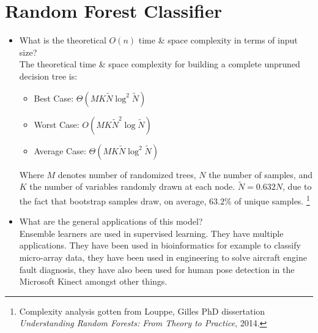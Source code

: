 \documentclass[twoside,openright,titlepage,numbers=noenddot,headinclude,%
               footinclude=true,cleardoublepage=empty,abstractoff,BCOR=5mm,%
               paper=a4,fontsize=11pt,ngerman,american]{scrreprt}
\numberwithin{theorem}{chapter}
\numberwithin{definition}{chapter}
\numberwithin{algorithm}{chapter}
\numberwithin{figure}{chapter}
\numberwithin{table}{chapter}
\numberwithin{equation}{chapter}
\begin{document}
\section*{Random Forest Classifier}
\begin{itemize} 
\item What is the theoretical $O(n)$ time \& space complexity in terms of input size?\\
The theoretical time \& space complexity for building a complete unpruned decision tree is:
\begin{itemize} 
\item Best Case: $\Theta(MK\widetilde{N}\log^2 \widetilde{N})$ 
\item Worst Case: $O(MK\widetilde{N}^2\log \widetilde{N})$ 
\item Average Case: $\Theta(MK\widetilde{N}\log^2 \widetilde{N})$
\end{itemize}
Where $M$ denotes number of randomized trees, $N$ the number of samples, and $K$ the number of variables randomly drawn at each node. $\widetilde{N} = 0.632 N$, due to the fact that bootstrap samples draw, on average, $63.2\%$ of unique samples. 
\footnote{Complexity analysis gotten from Louppe, Gilles PhD dissertation \textit{Understanding Random Forests: From Theory to Practice}, 2014.}

\item What are the general applications of this model?\\
Ensemble learners are used in supervised learning. They have multiple applications. They have been used in bioinformatics for example to classify micro-array data, they have been used in engineering to solve aircraft engine fault diagnosis, they have also been used for human pose detection in the Microsoft Kinect amongst other things. \\ 


\end{itemize}
\end{document}
